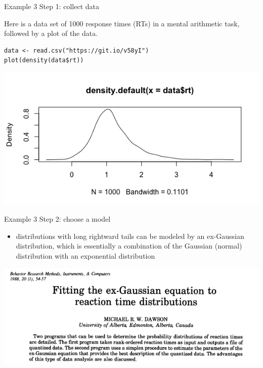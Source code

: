 \documentclass[presentation]{beamer}
\begin{document}
\begin{frame}[fragile,label=sec-25]{Example 3}
 Step 1: collect data

\vspace{5mm}

Here is a data set of 1000 response times (RTs) in a mental arithmetic task, followed by a plot of the data.  

\begin{verbatim}
data <- read.csv("https://git.io/v58yI")
plot(density(data$rt))
\end{verbatim}

\includegraphics[width=.9\linewidth]{figures/week2/rtPlot.png}
\end{frame}



\begin{frame}[label=sec-26]{Example 3}
Step 2: choose a model
\begin{itemize}
\item distributions with long rightward tails can be modeled by an ex-Gaussian distribution, which is essentially a combination of the Gaussian (normal) distribution with an exponential distribution
\end{itemize}

\vspace{3mm}

\includegraphics[width=.9\linewidth]{figures/week2/exGpaper.png}
\end{frame}
\end{document}
